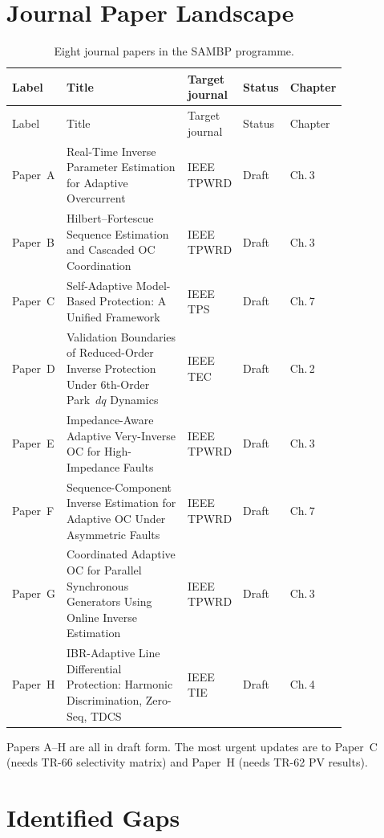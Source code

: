 \documentclass[12pt,a4paper]{article}
\begin{document}
\section{Journal Paper Landscape}
\label{sec:papers}

\begin{longtable}{p{0.12\linewidth}p{0.38\linewidth}p{0.13\linewidth}p{0.10\linewidth}p{0.10\linewidth}}
\caption{Eight journal papers in the SAMBP programme.}\label{tab:papers}\\
\toprule
Label & Title & Target journal & Status & Chapter \\
\midrule\endfirsthead
\toprule
Label & Title & Target journal & Status & Chapter \\
\midrule\endhead
Paper~A & Real-Time Inverse Parameter Estimation for Adaptive Overcurrent & IEEE TPWRD & Draft & Ch.\,3 \\[4pt]
Paper~B & Hilbert--Fortescue Sequence Estimation and Cascaded OC Coordination & IEEE TPWRD & Draft & Ch.\,3 \\[4pt]
Paper~C & Self-Adaptive Model-Based Protection: A Unified Framework & IEEE TPS & Draft & Ch.\,7 \\[4pt]
Paper~D & Validation Boundaries of Reduced-Order Inverse Protection Under 6th-Order Park~$dq$ Dynamics & IEEE TEC & Draft & Ch.\,2 \\[4pt]
Paper~E & Impedance-Aware Adaptive Very-Inverse OC for High-Impedance Faults & IEEE TPWRD & Draft & Ch.\,3 \\[4pt]
Paper~F & Sequence-Component Inverse Estimation for Adaptive OC Under Asymmetric Faults & IEEE TPWRD & Draft & Ch.\,7 \\[4pt]
Paper~G & Coordinated Adaptive OC for Parallel Synchronous Generators Using Online Inverse Estimation & IEEE TPWRD & Draft & Ch.\,3 \\[4pt]
Paper~H & IBR-Adaptive Line Differential Protection: Harmonic Discrimination, Zero-Seq, TDCS & IEEE TIE & Draft & Ch.\,4 \\
\bottomrule
\end{longtable}

\noindent Papers A--H are all in draft form.  The most urgent updates are to
Paper~C (needs TR-66 selectivity matrix) and Paper~H (needs TR-62 PV results).

\section{Identified Gaps}
\label{sec:gaps}
\end{document}
